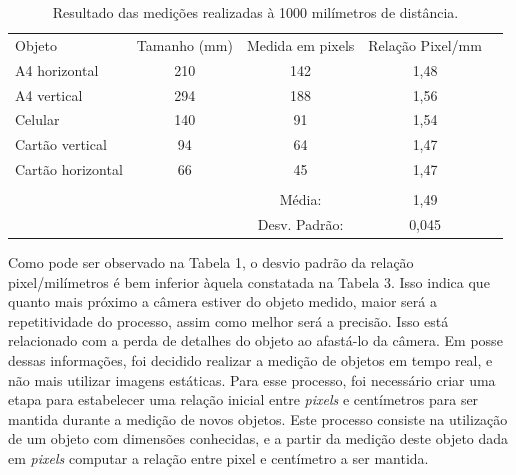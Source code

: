\documentclass[12pt]{article}
\begin{document}
	
	\begin{table}[h!]
		\begin{tabular}{lcccl}
			\cline{1-4}
			\multicolumn{1}{|l|}{Objeto}            & \multicolumn{1}{c|}{Tamanho (mm)} & \multicolumn{1}{c|}{Medida em pixels} & \multicolumn{1}{c|}{Relação Pixel/mm} &  \\ \cline{1-4}
			\multicolumn{1}{|l|}{A4 horizontal}     & \multicolumn{1}{c|}{210}          & \multicolumn{1}{c|}{142}              & \multicolumn{1}{c|}{1,48}             &  \\ \cline{1-4}
			\multicolumn{1}{|l|}{A4 vertical}       & \multicolumn{1}{c|}{294}          & \multicolumn{1}{c|}{188}              & \multicolumn{1}{c|}{1,56}             &  \\ \cline{1-4}
			\multicolumn{1}{|l|}{Celular}           & \multicolumn{1}{c|}{140}          & \multicolumn{1}{c|}{91}               & \multicolumn{1}{c|}{1,54}             &  \\ \cline{1-4}
			\multicolumn{1}{|l|}{Cartão vertical}   & \multicolumn{1}{c|}{94}           & \multicolumn{1}{c|}{64}               & \multicolumn{1}{c|}{1,47}             &  \\ \cline{1-4}
			\multicolumn{1}{|l|}{Cartão horizontal} & \multicolumn{1}{c|}{66}           & \multicolumn{1}{c|}{45}               & \multicolumn{1}{c|}{1,47}             &  \\ \cline{1-4}
			\multicolumn{1}{c}{}                    &                                   &                                       &                                       &  \\ \cline{3-4}
			\multicolumn{1}{c}{}                    & \multicolumn{1}{c|}{}             & \multicolumn{1}{c|}{Média:}           & \multicolumn{1}{c|}{1,49}             &  \\ \cline{3-4}
			\multicolumn{1}{c}{}                    & \multicolumn{1}{c|}{}             & \multicolumn{1}{c|}{Desv. Padrão:}    & \multicolumn{1}{c|}{0,045}            &  \\ \cline{3-4}
		\end{tabular}
		\caption{Resultado das medições realizadas à 1000 milímetros de distância.}
		\label{t3}
	\end{table}
	
	
	Como pode ser observado na Tabela 1, o desvio padrão da relação pixel/milímetros é bem inferior àquela constatada na Tabela 3. Isso indica que quanto mais próximo a câmera estiver do objeto medido, maior será a repetitividade do processo, assim como melhor será a precisão. Isso está relacionado com a perda de detalhes do objeto ao afastá-lo da câmera. Em posse dessas informações, foi decidido realizar a medição de objetos em tempo real, e não mais utilizar imagens estáticas. Para esse processo, foi necessário criar uma etapa para estabelecer uma relação inicial entre \textit{pixels} e centímetros para ser mantida durante a medição de novos objetos. Este processo consiste na utilização de um objeto com dimensões conhecidas, e a partir da medição deste objeto dada em \textit{pixels} computar a relação entre pixel e centímetro a ser mantida.
	
\end{document}
